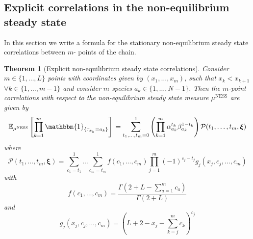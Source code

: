 \documentclass[10pt]{article}
\numberwithin{equation}{section}
\numberwithin{equation}{subsection}
\newtheorem{theorem}{Theorem}
\begin{document}
\subsection{Explicit correlations in the non-equilibrium steady state}\label{subsection-exact}
In this section we write a formula for the stationary non-equilibrium steady state correlations between $m$- points of the chain.
\begin{theorem}[Explicit non-equilibrium steady state correlations]\label{thm-correlations}
Consider $m\in \{1,\ldots,L\}$ points with coordinates given by $(x_{1},\ldots,x_{m})$, such that $x_{k}<x_{k+1}$ $\forall k\in \{1,\ldots,m-1\}$
and consider $m$ species $a_{k}\in \{1,\ldots,N-1\}$. Then the $m$-point correlations with respect to the non-equilibrium steady state measure $\mu^{\text{NESS}}$ are given by 
\begin{equation}\label{exactCorrelations}
\mathbb{E}_{\mu^{\text{NESS}}}\left[\prod_{k=1}^{m}\mathbbm{1}_{\{\tau_{x_{k}}=a_{k}\}}\right]\\=\sum_{t_{1},\ldots,t_{m}=0}^{1}\left(\prod_{k=1}^{m}\alpha_{a_{k}}^{t_{k}}\beta_{a_{k}}^{1-t_{k}}\right)\mathcal{P}(t_{1},\ldots,t_{m},\bm{\xi})
\end{equation}
where
\begin{equation}\label{abs-probabilities}
	\mathcal{P}(t_{1},\ldots,t_{m},\bm{\xi})=\sum_{c_{1}=t_{1}}^{1}\ldots\sum_{c_{m}=t_{m}}^{1}f(c_{1},\ldots,c_{m})\prod_{j=1}^{m}(-1)^{c_{j}-t_{j}}g_{j}(x_{j},c_{j},\ldots,c_{m})
\end{equation}
with
\begin{equation}\label{powerCoeffNOspec}
	f(c_{1},\ldots,c_{m})=\frac{\Gamma(2+L-\sum_{a=1}^{m}c_{a})}{\Gamma(2+L)}
\end{equation}
and
\begin{equation}\label{powerCoeffSpecies}
	g_{j}(x_{j},c_{j},\ldots,c_{m})=\left(L+2-x_{j}-\sum_{k=j}^{m}c_{k}\right)^{c_{j}}
\end{equation}
\end{theorem}
\begin{comment}
 Consider . . Then, with respect to the non-equilibrium stationary distribution, the correlations among these particles are given by
\begin{equation}\label{exactCorrelations}
	\mathbb{E}_{\mu^{\text{NESS}}}\left[\prod_{k=1}^{m}\mathbbm{1}_{\{\tau_{x_{k}}=a_{k}\}}\right]=\sum_{c_{1},\ldots,c_{m}=0}^{1}
	f(L,c_{1},\ldots,c_{m})\prod_{k=1}^{m}(\alpha_{a_{k}}-\beta_{a_{k}})^{c_{k}}\beta_{a_{k}}^{1-c_{k}}g_{k}(L,y_{k},c_{k},\ldots,c_{m})
\end{equation}
\end{comment}
\end{document}
